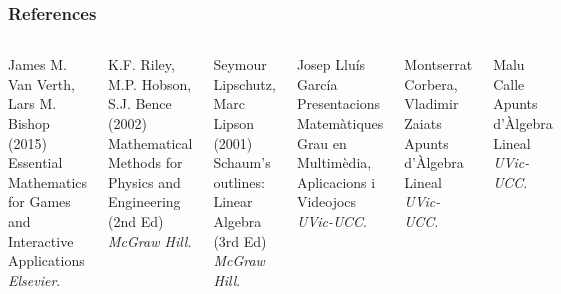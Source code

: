 \begin{frame}
    \frametitle{References}
    
    \footnotesize{
    \begin{thebibliography}{99} %
    
    \begin{columns}[t]
    
     James M. Van Verth, Lars M. Bishop (2015)
    \newblock Essential Mathematics for Games and Interactive Applications
    \newblock \emph{Elsevier}.
    
     K.F. Riley, M.P. Hobson, S.J. Bence (2002)
    \newblock Mathematical Methods for Physics and Engineering (2nd Ed)
    \newblock \emph{McGraw Hill}.
    
     Seymour Lipschutz, Marc Lipson (2001)
    \newblock Schaum's outlines: Linear Algebra (3rd Ed)
    \newblock \emph{McGraw Hill}.
    
    
     Josep Lluís García
    \newblock Presentacions Matemàtiques Grau en Multimèdia, Aplicacions i Videojocs
    \newblock \emph{UVic-UCC}.
    
     Montserrat Corbera, Vladimir Zaiats
    \newblock Apunts d'Àlgebra Lineal
    \newblock \emph{UVic-UCC}.
    
     Malu Calle
    \newblock Apunts d'Àlgebra Lineal
    \newblock \emph{UVic-UCC}.
    
    \end{columns}
    \end{thebibliography}
    
    }
    \end{frame}
